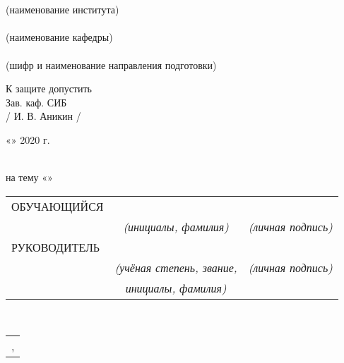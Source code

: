 \emergencystretch=25pt
\begin{titlepage}
	\begin{center}
		\hfill \break
		\normalsize{\universityrus}\\
		
		\hfill \break
		\underline{\normalsize{\instituterus}}\\
		\small{(наименование института)}\\
		\underline{\normalsize{\departmentrus}}\\
		\small{(наименование кафедры)}\\
		
		\hfill\break
		\normalsize{\studiesrus}\\
		\small{(шифр и наименование направления подготовки)}
	\end{center}
	\par\smallskip
	\begin{flushright}
		\normalsize{К защите допустить}
		\\ \normalsize{Зав. каф. СИБ}
		\\ \normalsize{\underline{\hspace{1.2in}} / И. В. Аникин /}
		\\
		\rule{0cm}{1cm} \normalsize{«\underline{\hspace{0.5in}}» \underline{\hspace{1.2in}} 2020 г.}
	\end{flushright}
	
	\par\smallskip
	
	\begin{center}
		\large{\thesistyperus\\
			\large{на тему «\thesistitlerus»}}\\
		\hfill \break
	\end{center}
	\normalsize{
		\begin{tabular}{lcr}
			ОБУЧАЮЩИЙСЯ & \underline{\authorNamerus} &  \underline{\hspace{2.7in}}\\
			& \small\textit{(инициалы, фамилия)} & \small\textit{(личная подпись)}\\
			РУКОВОДИТЕЛЬ & \underline{\tutorrus} &  \underline{\hspace{2.7in}}\\
			& \small\textit{(учёная степень, звание,} & \small\textit{(личная подпись)}\\
			& \small\textit{инициалы, фамилия)}&
		\end{tabular}
	}\\
	
	\begin{table}[b!]
		\centering
		\begin{tabular}{c}
			\locationrus,  \submissiondaterus
		\end{tabular}
	\end{table}
	
	\thispagestyle{empty} %
	
\end{titlepage}
